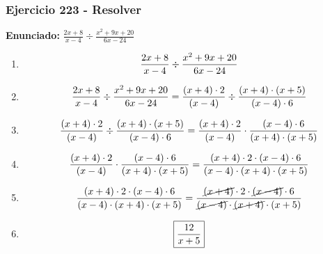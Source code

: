 \documentclass[11pt,a4paper]{article}
\newcommand{\fitmath}[1]{%
\[
\setbox0=\hbox{$\displaystyle #1$}%
\ifdim\wd0>\linewidth
\resizebox{\linewidth}{!}{$\displaystyle #1$}%
\else
#1%
\fi
\]
}
\begin{document}
\subsubsection*{Ejercicio 223 - Resolver}
\textbf{Enunciado:} $ \frac{2 x + 8}{x - 4} \div \frac{x^{2} + 9 x + 20}{6 x - 24} $\par
\begin{enumerate}[leftmargin=2em]
\item \fitmath{\frac{2 x + 8}{x - 4} \div \frac{x^{2} + 9 x + 20}{6 x - 24}}
\item \fitmath{\frac{2 x + 8}{x - 4} \div \frac{x^{2} + 9 x + 20}{6 x - 24}= \frac{\left(x + 4\right)\cdot 2}{\left(x - 4\right)} \div \frac{\left(x + 4\right)\cdot \left(x + 5\right)}{\left(x - 4\right)\cdot 6}}
\item \fitmath{\frac{\left(x + 4\right)\cdot 2}{\left(x - 4\right)}\div \frac{\left(x + 4\right)\cdot \left(x + 5\right)}{\left(x - 4\right)\cdot 6}= \frac{\left(x + 4\right)\cdot 2}{\left(x - 4\right)}\cdot \frac{\left(x - 4\right)\cdot 6}{\left(x + 4\right)\cdot \left(x + 5\right)}}
\item \fitmath{\frac{\left(x + 4\right)\cdot 2}{\left(x - 4\right)}\cdot \frac{\left(x - 4\right)\cdot 6}{\left(x + 4\right)\cdot \left(x + 5\right)}= \frac{\left(x + 4\right)\cdot 2\cdot \left(x - 4\right)\cdot 6}{\left(x - 4\right)\cdot \left(x + 4\right)\cdot \left(x + 5\right)}}
\item \fitmath{\frac{\left(x + 4\right)\cdot 2\cdot \left(x - 4\right)\cdot 6}{\left(x - 4\right)\cdot \left(x + 4\right)\cdot \left(x + 5\right)}= \frac{\cancel{\left(x + 4\right)}\cdot 2\cdot \cancel{\left(x - 4\right)}\cdot 6}{\cancel{\left(x - 4\right)}\cdot \cancel{\left(x + 4\right)}\cdot \left(x + 5\right)}}
\item \fitmath{\boxed{\frac{12}{x + 5}}}
\end{enumerate}

\vspace{0.12cm}
\end{document}
